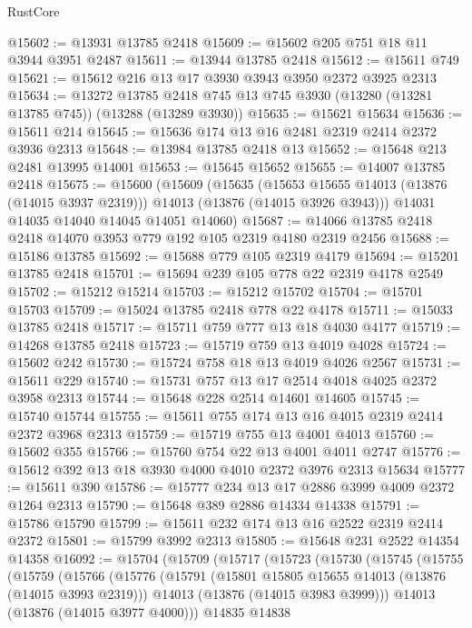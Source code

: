 \begin{lexlean}{RustCore}
\begin{coremodule}
@15602 := @13931 @13785 @2418
@15609 := @15602 @205 @751 @18 @11 @3944 @3951 @2487
@15611 := @13944 @13785 @2418
@15612 := @15611 @749
@15621 := @15612 @216 @13 @17 @3930 @3943 @3950 @2372 @3925 @2313
@15634 := @13272
    @13785
    @2418
    @745
    @13
    @745
    @3930
    (@13280 (@13281 @13785 @745))
    (@13288 (@13289 @3930))
@15635 := @15621 @15634
@15636 := @15611 @214
@15645 := @15636 @174 @13 @16 @2481 @2319 @2414 @2372 @3936 @2313
@15648 := @13984 @13785 @2418 @13
@15652 := @15648 @213 @2481 @13995 @14001
@15653 := @15645 @15652
@15655 := @14007 @13785 @2418
@15675 := @15600
    (@15609
      (@15635
        (@15653 @15655 @14013 (@13876 (@14015 @3937 @2319)))
        @14013
        (@13876 (@14015 @3926 @3943)))
      @14031
      @14035
      @14040
      @14045
      @14051
      @14060)
@15687 := @14066 @13785 @2418 @2418 @14070 @3953 @779 @192 @105 @2319 @4180 @2319 @2456
@15688 := @15186 @13785
@15692 := @15688 @779 @105 @2319 @4179
@15694 := @15201 @13785 @2418
@15701 := @15694 @239 @105 @778 @22 @2319 @4178 @2549
@15702 := @15212 @15214
@15703 := @15212 @15702
@15704 := @15701 @15703
@15709 := @15024 @13785 @2418 @778 @22 @4178
@15711 := @15033 @13785 @2418
@15717 := @15711 @759 @777 @13 @18 @4030 @4177
@15719 := @14268 @13785 @2418
@15723 := @15719 @759 @13 @4019 @4028
@15724 := @15602 @242
@15730 := @15724 @758 @18 @13 @4019 @4026 @2567
@15731 := @15611 @229
@15740 := @15731 @757 @13 @17 @2514 @4018 @4025 @2372 @3958 @2313
@15744 := @15648 @228 @2514 @14601 @14605
@15745 := @15740 @15744
@15755 := @15611 @755 @174 @13 @16 @4015 @2319 @2414 @2372 @3968 @2313
@15759 := @15719 @755 @13 @4001 @4013
@15760 := @15602 @355
@15766 := @15760 @754 @22 @13 @4001 @4011 @2747
@15776 := @15612 @392 @13 @18 @3930 @4000 @4010 @2372 @3976 @2313 @15634
@15777 := @15611 @390
@15786 := @15777 @234 @13 @17 @2886 @3999 @4009 @2372 @1264 @2313
@15790 := @15648 @389 @2886 @14334 @14338
@15791 := @15786 @15790
@15799 := @15611 @232 @174 @13 @16 @2522 @2319 @2414 @2372
@15801 := @15799 @3992 @2313
@15805 := @15648 @231 @2522 @14354 @14358
@16092 := @15704
    (@15709
      (@15717
        (@15723
          (@15730
            (@15745
              (@15755
                (@15759
                  (@15766
                    (@15776
                      (@15791
                        (@15801 @15805 @15655 @14013 (@13876 (@14015 @3993 @2319)))
                        @14013
                        (@13876 (@14015 @3983 @3999)))
                      @14013
                      (@13876 (@14015 @3977 @4000)))
                    @14835
                    @14838

\end{coremodule}
\end{lexlean}
